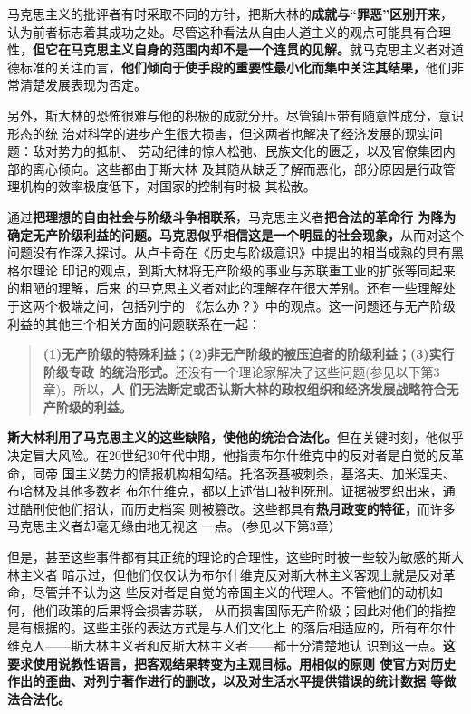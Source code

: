 马克思主义的批评者有时采取不同的方针，把斯大林的\textbf{成就与“罪恶”区别开来}，
认为前者标志着其成功之处。尽管这种看法从自由人道主义的观点可能具有合理
性，\textbf{但它在马克思主义自身的范围内却不是一个连贯的见解。}就马克思主义者对道
德标准的关注而言，\textbf{他们倾向于使手段的重要性最小化而集中关注其结果，}他们非
常清楚发展表现为否定。

另外，斯大林的恐怖很难与他的积极的成就分开。尽管镇压带有随意性成分，意识形态的统
治对科学的进步产生很大损害，但这两者也解决了经济发展的现实问题：敌对势力的抵制、
劳动纪律的惊人松弛、民族文化的匮乏，以及官僚集团内部的离心倾向。这些都由于斯大林
及其随从缺乏了解而恶化，部分原因是行政管理机构的效率极度低下，对国家的控制有时极
其松散。

通过\textbf{把理想的自由社会与阶级斗争相联系}，马克思主义者\textbf{把合法的革命行
  为降为确定无产阶级利益的问题。马克思似乎相信这是一个明显的社会现象，}从而对这个
问题没有作深入探讨。从卢卡奇在《历史与阶级意识》中提出的相当成熟的具有黑格尔理论
印记的观点，到斯大林将无产阶级的事业与苏联重工业的扩张等同起来的粗陋的理解，后来
的马克思主义者对此的理解存在很大差别。还有一些理解处于这两个极端之间，包括列宁的
《怎么办？》中的观点。这一问题还与无产阶级利益的其他三个相关方面的问题联系在一起：
\begin{quotation}
  \textbf{(1)无产阶级的特殊利益；(2)非无产阶级的被压迫者的阶级利益；(3)实行阶级专政
    的统治形式。}还没有一个理论家解决了这些问题(参见以下第3章)。所以，\textbf{人
    们无法断定或否认斯大林的政权组织和经济发展战略符合无产阶级的利益。}
\end{quotation}

\textbf{斯大林利用了马克思主义的这些缺陷，使他的统治合法化。}但在关键时刻，他似乎
决定冒大风险。在20世纪30年代中期，他指责布尔什维克中的反对者是自觉的反革命，同帝
国主义势力的情报机构相勾结。托洛茨基被刺杀，基洛夫、加米涅夫、布哈林及其他多数老
布尔什维克，都以上述借口被判死刑。证据被罗织出来，通过酷刑使他们招认，而历史档案
则被篡改。这些都具有\textbf{热月政变的特征}，而许多马克思主义者却毫无缘由地无视这
一点。（参见以下第3章）

但是，甚至这些事件都有其正统的理论的合理性，这些时时被一些较为敏感的斯大林主义者
暗示过，但他们仅仅认为布尔什维克反对斯大林主义客观上就是反对革命，尽管并不认为这
些反对者是自觉的帝国主义的代理人。不管他们的动机如何，他们政策的后果将会损害苏联，
从而损害国际无产阶级；因此对他们的指控是有根据的。这些主张的表达方式是与人们文化上
的落后相适应的，所有布尔什维克人——斯大林主义者和反斯大林主义者——都十分清楚地认
识到这一点。\textbf{这要求使用说教性语言，把客观结果转变为主观目标。用相似的原则
  使官方对历史作出的歪曲、对列宁著作进行的删改，以及对生活水平提供错误的统计数据
  等做法合法化。}

